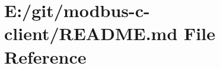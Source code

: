 \hypertarget{modbus-c-client_2_r_e_a_d_m_e_8md}{}\section{E\+:/git/modbus-\/c-\/client/\+R\+E\+A\+D\+ME.md File Reference}
\label{modbus-c-client_2_r_e_a_d_m_e_8md}
